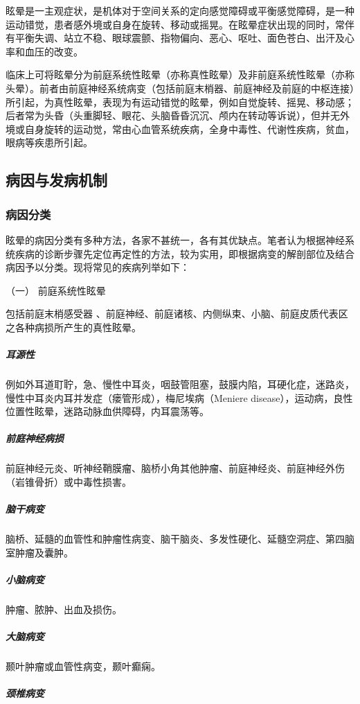 眩晕是一主观症状，是机体对于空间关系的定向感觉障碍或平衡感觉障碍，是一种运动错觉，患者感外境或自身在旋转、移动或摇晃。在眩晕症状出现的同时，常伴有平衡失调、站立不稳、眼球震颤、指物偏向、恶心、呕吐、面色苍白、出汗及心率和血压的改变。

临床上可将眩晕分为前庭系统性眩晕（亦称真性眩晕）及非前庭系统性眩晕（亦称头晕）。前者由前庭神经系统病变（包括前庭末梢器、前庭神经及前庭的中枢连接）所引起，为真性眩晕，表现为有运动错觉的眩晕，例如自觉旋转、摇晃、移动感；后者常为头昏（头重脚轻、眼花、头脑昏昏沉沉、颅内在转动等诉说），但并无外境或自身旋转的运动觉，常由心血管系统疾病，全身中毒性、代谢性疾病，贫血，眼病等疾患所引起。

\subsection{病因与发病机制}

\subsubsection{病因分类}

眩晕的病因分类有多种方法，各家不甚统一，各有其优缺点。笔者认为根据神经系统疾病的诊断步骤先定位再定性的方法，较为实用，即根据病变的解剖部位及结合病因予以分类。现将常见的疾病列举如下：

\hypertarget{text00012.htmlux5cux23CHP1-3-1-1-1}{}
（一） 前庭系统性眩晕

包括前庭末梢感受器
、前庭神经、前庭诸核、内侧纵束、小脑、前庭皮质代表区之各种病损所产生的真性眩晕。

\subparagraph{耳源性}

例如外耳道耵聍，急、慢性中耳炎，咽鼓管阻塞，鼓膜内陷，耳硬化症，迷路炎，慢性中耳炎内耳并发症（瘘管形成），梅尼埃病（Meniere
disease），运动病，良性位置性眩晕，迷路动脉血供障碍，内耳震荡等。

\subparagraph{前庭神经病损}

前庭神经元炎、听神经鞘膜瘤、脑桥小角其他肿瘤、前庭神经炎、前庭神经外伤（岩锥骨折）或中毒性损害。

\subparagraph{脑干病变}

脑桥、延髓的血管性和肿瘤性病变、脑干脑炎、多发性硬化、延髓空洞症、第四脑室肿瘤及囊肿。

\subparagraph{小脑病变}

肿瘤、脓肿、出血及损伤。

\subparagraph{大脑病变}

颞叶肿瘤或血管性病变，颞叶癫痫。

\subparagraph{颈椎病变}

